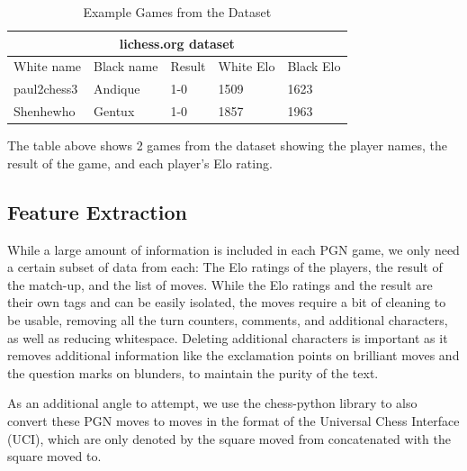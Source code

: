 \documentclass[conference]{IEEEtran}
\begin{document}
\begin{table}[htbp]
\vspace{.01cm}
\caption{Example Games from the Dataset}
\begin{center}
\begin{tabular}{|lllll|}
\hline
\multicolumn{5}{|c|}{lichess.org dataset}                                                                                                      \\ \hline
\multicolumn{1}{|l|}{White name}  & \multicolumn{1}{l|}{Black name} & \multicolumn{1}{l|}{Result} & \multicolumn{1}{l|}{White Elo} & Black Elo \\ \hline
\multicolumn{1}{|l|}{paul2chess3} & \multicolumn{1}{l|}{Andique}    & \multicolumn{1}{l|}{1-0}    & \multicolumn{1}{l|}{1509}      & 1623      \\ \hline
\multicolumn{1}{|l|}{Shenhewho}   & \multicolumn{1}{l|}{Gentux}     & \multicolumn{1}{l|}{1-0}    & \multicolumn{1}{l|}{1857}      & 1963      \\ \hline
\end{tabular}
\begin{minipage}{8cm}
    \vspace{0.1cm}
    \small The table above shows 2 games from the dataset showing the player names, the result of the game, and each player's Elo rating.
\end{minipage}
\end{center}
\label{table:example-games}
\end{table}

\subsection{Feature Extraction}

While a large amount of information is included in each PGN game, we only need a certain subset of data from each: The Elo ratings of the players, the result of the match-up, and the list of moves. While the Elo ratings and the result are their own tags and can be easily isolated, the moves require a bit of cleaning to be usable, removing all the turn counters, comments, and additional characters, as well as reducing whitespace. Deleting additional characters is important as it removes additional information like the exclamation points on brilliant moves and the question marks on blunders, to maintain the purity of the text.

As an additional angle to attempt, we use the chess-python library to also convert these PGN moves to moves in the format of the Universal Chess Interface (UCI), which are only denoted by the square moved from concatenated with the square moved to.
\end{document}
